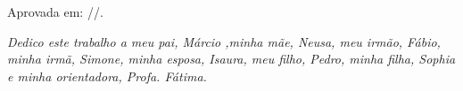 \documentclass[
	12pt,				%
	openright,			%
	twoside,			%
	a4paper,			%
	english,			%
  	brazil				%
	]{abntex2}
\begin{document}
%
% 
%
\begin{folhadeaprovacao}

  \begin{center}
    {\MakeUppercase{\imprimirautor}}

    \vspace*{\fill}\vspace*{\fill}
    \begin{center}
      \MakeUppercase{\imprimirtitulo}
    \end{center}
    \vspace*{\fill}
    
    \hspace{.45\textwidth}
    \begin{minipage}{.5\textwidth}
        \imprimirpreambulo
    \end{minipage}%
    \vspace*{\fill}
   \end{center}
        
   Aprovada em: \underline{\hspace{0.5cm}}/\underline{\hspace{0.5cm}}/\underline{\hspace{2cm}}.

\end{folhadeaprovacao}

\begin{dedicatoria}
   \vspace*{\fill}
   \centering
   \noindent
   \textit{ Dedico este trabalho a meu pai, Márcio ,minha mãe, Neusa,  meu irmão, Fábio, minha irmã, Simone, minha esposa, Isaura,  meu filho, Pedro, minha filha, Sophia e minha orientadora, Profa. Fátima.} \vspace*{\fill}
\end{dedicatoria}
\end{document}
